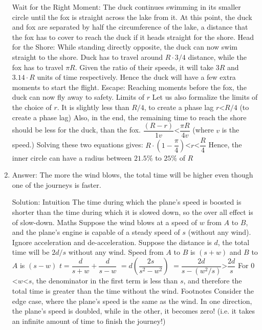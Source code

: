\begin{enumerate}
Wait for the Right Moment: The duck continues swimming in its smaller circle until the fox is straight across the lake from it. At this point, the duck and fox are separated by half the circumference of the lake, a distance that the fox has to cover to reach the duck if it heads straight for the shore.
Head for the Shore: While standing directly opposite, the duck can now swim straight to the shore. Duck has to travel around $R \cdot 3/4$ distance, while the fox has to travel $\pi R$. Given the ratio of their speeds, it will take $3 R$ and $3.14 \cdot R$ units of time respectively. Hence the duck will have a few extra moments to start the flight.
Escape: Reaching moments before the fox, the duck can now fly away to safety.
Limits of $r$
Let us also formalize the limits of the choice of $r$.
It is slightly less than $R/4$, to create a phase lag
$r $<$ R/4$ (to create a phase lag)
Also, in the end, the remaining time to reach the shore should be less for the duck, than the fox.
$\dfrac{(R-r)}{1v} $<$ \dfrac{\pi R}{4v}$ (where $v$ is the speed.)
Solving these two equations gives:
${R} \cdot (1 - \dfrac{\pi}{4}) $<$ r $<$ \dfrac{R}{4}$
Hence, the inner circle can have a radius between $21.5\%$ to $25\%$ of $R$




\item
Answer: The more the wind blows, the total time will be higher even though one of the journeys is faster.
 
Solution: Intuition
The time during which the plane's speed is boosted is shorter than the time during which it is slowed down, so the over all effect is of slow-down.
Maths
Suppose the wind blows at a speed of $w$ from $A$ to $B$, and the plane's engine is capable of a steady speed of $s$ (without any wind). Ignore acceleration and de-acceleration.
Suppose the distance is $d$, the total time will be $2d/s$ without any wind.
Speed from $A$ to $B$ is $(s + w)$ and $B$ to $A$ is $(s - w)$
$t = \dfrac{d}{s+w} + \dfrac{d}{s-w}$
$= d ( \dfrac{2 s}{s^2 - w^2})$
$= \dfrac{2d}{s - (w^2/s) } $>$ \dfrac{2d}{s}$
For $0 $<$ w $<$ s$, the denominator in the first term is less than $s$, and therefore the total time is greater than the time without the wind.
Footnotes
Consider the edge case, where the plane's speed is the same as the wind. In one direction, the plane's speed is doubled, while in the other, it becomes zero! (i.e. it takes an infinite amount of time to finish the journey!)




\end{enumerate}
